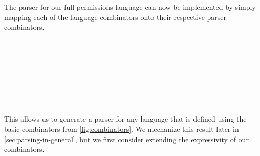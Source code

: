 The parser for our full permissions language can now be implemented by simply
mapping each of the language combinators onto their respective parser
combinators.
%
\begin{code}[hide]%
%
\>[4]\AgdaSpace{}%
\AgdaSymbol{:}\AgdaSpace{}%
\AgdaSpace{}%
\<%
\\
%
\>[4]\AgdaSpace{}%
\AgdaSymbol{:}\AgdaSpace{}%
\AgdaSpace{}%
\<%
\\
%
\>[4]\AgdaSpace{}%
\AgdaSymbol{:}\AgdaSpace{}%
\AgdaSpace{}%
\<%
\\
%
\>[4]\AgdaSpace{}%
\AgdaSymbol{:}\AgdaSpace{}%
\AgdaSpace{}%
\<%
\end{code}
\begin{code}%
%
\>[4]%
\>[23]\AgdaSymbol{=}\AgdaSpace{}%
\AgdaSpace{}%
\AgdaSpace{}%
\AgdaSymbol{(}\AgdaSpace{}%
\AgdaSpace{}%
\AgdaSymbol{)}\<%
\\
%
\>[4]%
\>[23]\AgdaSymbol{=}\AgdaSpace{}%
\AgdaSymbol{(}\AgdaSpace{}%
\AgdaSymbol{)}\AgdaSpace{}%
\AgdaSpace{}%
\AgdaSymbol{(}\AgdaSpace{}%
\AgdaSymbol{)}\<%
\\
%
\>[4]%
\>[23]\AgdaSymbol{=}\AgdaSpace{}%
\AgdaSymbol{(}\AgdaSpace{}%
\AgdaSymbol{)}\AgdaSpace{}%
\AgdaSpace{}%
\AgdaSymbol{(}\AgdaSpace{}%
\AgdaSymbol{)}\<%
\\
%
\>[4]%
\>[23]\AgdaSymbol{=}\AgdaSpace{}%
\AgdaSymbol{(}\AgdaSpace{}%
\AgdaSymbol{)}\AgdaSpace{}%
\AgdaSpace{}%
\AgdaSymbol{(}\AgdaSpace{}%
\AgdaSymbol{)}\<%
\end{code}
%
This allows us to generate a parser for any language that is defined using the basic combinators from \cref{fig:combinators}. We mechanize this result later in \cref{sec:parsing-in-general}, but we first consider extending the expressivity of our combinators.

